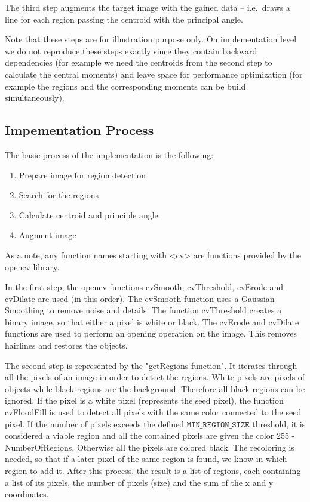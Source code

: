 \documentclass[letter,12pt]{article}
\begin{document}
The third step augments the target image with the gained data -- i.e.\ draws a line for each region passing the centroid with the principal angle.

Note that these steps are for illustration purpose only. On implementation level we do not reproduce these steps exactly since they contain backward dependencies (for example we need the centroids from the second step to calculate the central moments) and leave space for performance optimization (for example the regions and the corresponding moments can be build simultaneously).

\subsection{Impementation Process}
The basic process of the implementation is the following:
\begin{enumerate}
\item Prepare image for region detection
\item Search for the regions
\item Calculate centroid and principle angle
\item Augment image
\end{enumerate}

As a note, any function names starting with <cv> are functions provided by the opencv library.

In the first step, the opencv functions cvSmooth, cvThreshold, cvErode and cvDilate are used (in this order).  The cvSmooth function uses a Gaussian Smoothing to remove noise and details.  The function cvThreshold creates a binary image, so that either a pixel is white or black.  The cvErode and cvDilate functions are used to perform an opening operation on the image.  This removes hairlines and restores the objects.

The second step is represented by the "getRegions function". It iterates through all the pixels of an image in order to detect the regions.  White pixels are pixels of objects while black regions are the background.  Therefore all black regions can be ignored.  If the pixel is a white pixel (represents the seed pixel), the function cvFloodFill is used to detect all pixels with the same color connected to the seed pixel.  If the number of pixels exceeds the defined $\mathtt{MIN\_REGION\_SIZE}$ threshold, it is considered a viable region and all the contained pixels are given the color 255 - NumberOfRegions.  Otherwise all the pixels are colored black.  The recoloring is needed, so that if a later pixel of the same region is found, we know in which region to add it.  After this process, the result is a list of regions, each containing a list of its pixels, the number of pixels (size) and the sum of the x and y coordinates. 
\end{document}
